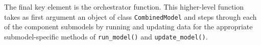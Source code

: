 \documentclass[
]{article}
\newenvironment{Shaded}{\begin{snugshade}}{\end{snugshade}}
\newcommand{\ControlFlowTok}[1]{\textcolor[rgb]{0.00,0.23,0.31}{\textbf{#1}}}
\newcommand{\FunctionTok}[1]{\textcolor[rgb]{0.28,0.35,0.67}{#1}}
\newcommand{\NormalTok}[1]{\textcolor[rgb]{0.00,0.23,0.31}{#1}}
\newcommand{\OtherTok}[1]{\textcolor[rgb]{0.00,0.23,0.31}{#1}}
\newcommand{\SpecialCharTok}[1]{\textcolor[rgb]{0.37,0.37,0.37}{#1}}
\newcommand{\StringTok}[1]{\textcolor[rgb]{0.13,0.47,0.30}{#1}}
\begin{document}
\begin{Shaded}
\end{Shaded}

The final key element is the orchestrator function. This higher-level
function takes as first argument an object of class
\texttt{CombinedModel} and steps through each of the component submodels
by running and updating data for the appropriate submodel-specific
methods of \texttt{run\_model()} and \texttt{update\_model()}.
\end{document}
